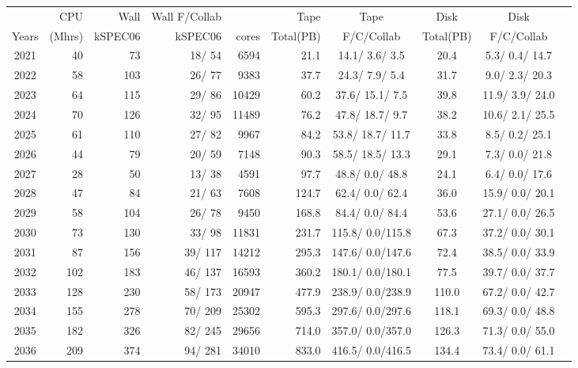 \documentclass[12pt]{article}
\begin{document}
\begin{table}
\footnotesize
 \centering \begin{tabular}[h]{crrrrrcccc}
 & CPU &Wall&Wall F/Collab&\qquad  & Tape\qquad& Tape\qquad  & Disk\qquad  & Disk\qquad \\
Years&(Mhrs)&kSPEC06&kSPEC06&cores& Total(PB)&F/C/Collab & Total(PB) &F/C/Collab\\
\hline
2021&	  40&	  73&	  18/  54&	  6594&	     21.1&	  14.1/  3.6/  3.5&	     20.4&	   5.3/  0.4/ 14.7\\
2022&	  58&	 103&	  26/  77&	  9383&	     37.7&	  24.3/  7.9/  5.4&	     31.7&	   9.0/  2.3/ 20.3\\
2023&	  64&	 115&	  29/  86&	 10429&	     60.2&	  37.6/ 15.1/  7.5&	     39.8&	  11.9/  3.9/ 24.0\\
2024&	  70&	 126&	  32/  95&	 11489&	     76.2&	  47.8/ 18.7/  9.7&	     38.2&	  10.6/  2.1/ 25.5\\
2025&	  61&	 110&	  27/  82&	  9967&	     84.2&	  53.8/ 18.7/ 11.7&	     33.8&	   8.5/  0.2/ 25.1\\
2026&	  44&	  79&	  20/  59&	  7148&	     90.3&	  58.5/ 18.5/ 13.3&	     29.1&	   7.3/  0.0/ 21.8\\
2027&	  28&	  50&	  13/  38&	  4591&	     97.7&	  48.8/  0.0/ 48.8&	     24.1&	   6.4/  0.0/ 17.6\\
2028&	  47&	  84&	  21/  63&	  7608&	    124.7&	  62.4/  0.0/ 62.4&	     36.0&	  15.9/  0.0/ 20.1\\
2029&	  58&	 104&	  26/  78&	  9450&	    168.8&	  84.4/  0.0/ 84.4&	     53.6&	  27.1/  0.0/ 26.5\\
2030&	  73&	 130&	  33/  98&	 11831&	    231.7&	 115.8/  0.0/115.8&	     67.3&	  37.2/  0.0/ 30.1\\
2031&	  87&	 156&	  39/ 117&	 14212&	    295.3&	 147.6/  0.0/147.6&	     72.4&	  38.5/  0.0/ 33.9\\
2032&	 102&	 183&	  46/ 137&	 16593&	    360.2&	 180.1/  0.0/180.1&	     77.5&	  39.7/  0.0/ 37.7\\
2033&	 128&	 230&	  58/ 173&	 20947&	    477.9&	 238.9/  0.0/238.9&	    110.0&	  67.2/  0.0/ 42.7\\
2034&	 155&	 278&	  70/ 209&	 25302&	    595.3&	 297.6/  0.0/297.6&	    118.1&	  69.3/  0.0/ 48.8\\
2035&	 182&	 326&	  82/ 245&	 29656&	    714.0&	 357.0/  0.0/357.0&	    126.3&	  71.3/  0.0/ 55.0\\
2036&	 209&	 374&	  94/ 281&	 34010&	    833.0&	 416.5/  0.0/416.5&	    134.4&	  73.4/  0.0/ 61.1\\

\end{tabular}
\end{table}
\end{document}
